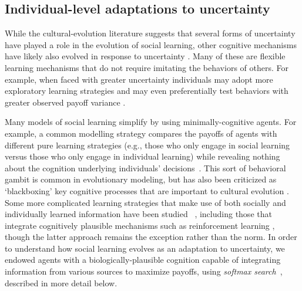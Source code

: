\documentclass[letterpaper,11.5pt]{scrartcl}
\begin{document}


\subsection{Individual-level adaptations to uncertainty} 

While the cultural-evolution literature suggests that several forms of uncertainty have played a role in the evolution of social learning, other cognitive mechanisms have likely also evolved in response to uncertainty \citep{volz2012,johnson2013evolution,van2018uncertainty}. Many of these are flexible learning mechanisms that do not require imitating the behaviors of others. For example, when faced with greater uncertainty individuals may adopt more exploratory learning strategies and may even preferentially test behaviors with greater observed payoff variance \citep{Wilson2014,Gershman2019}.

Many models of social learning simplify by using minimally-cognitive agents. For example, a common modelling strategy compares the payoffs of agents with different pure learning strategies (e.g., those who only engage in social learning versus those who only engage in individual learning) while revealing nothing about the cognition underlying individuals' decisions~\citep{BoydRicherson1985, Rogers1988, 
aoki2005}. This sort of behavioral gambit is common in evolutionary modeling, but has also been criticized as `blackboxing' key cognitive processes that are important to cultural evolution \citep{Heyes2016,Kendal2018}.  
Some more complicated learning strategies that make use of both socially and individually learned information have been studied ~\citep{Enquist2007, perreault2012bayesian}, including those that integrate cognitively plausible mechanisms such as reinforcement learning \citep{lindstrom2016co}, though the latter approach remains the exception rather than the norm. In order to understand how social learning evolves as an adaptation to uncertainty, we endowed agents with a biologically-plausible cognition capable of integrating information from various sources to maximize payoffs, using \emph{softmax search}~\citep{Gershman2019}, described in more detail below. 
\end{document}
